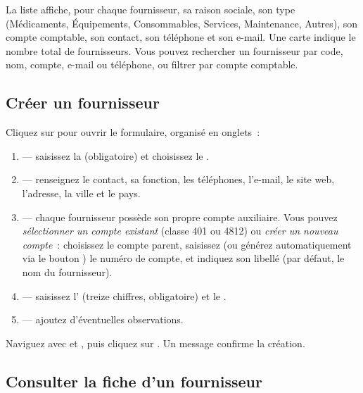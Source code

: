 La liste affiche, pour chaque fournisseur, sa raison sociale, son type (Médicaments, Équipements, Consommables, Services, Maintenance, Autres), son compte comptable, son contact, son téléphone et son e-mail. Une carte indique le nombre total de fournisseurs. Vous pouvez rechercher un fournisseur par code, nom, compte, e-mail ou téléphone, ou filtrer par compte comptable.


\subsection{Créer un fournisseur}

Cliquez sur  pour ouvrir le formulaire, organisé en onglets~:

\begin{enumerate}
  \item {} — saisissez la  (obligatoire) et choisissez le .
  \item {} — renseignez le contact, sa fonction, les téléphones, l'e-mail, le site web, l'adresse, la ville et le pays.
  \item {} — chaque fournisseur possède son propre compte auxiliaire. Vous pouvez \emph{sélectionner un compte existant} (classe 401 ou 4812) ou \emph{créer un nouveau compte}~: choisissez le compte parent, saisissez (ou générez automatiquement via le bouton ) le numéro de compte, et indiquez son libellé (par défaut, le nom du fournisseur).
  \item {} — saisissez l' (treize chiffres, obligatoire) et le .
  \item {} — ajoutez d'éventuelles observations.
\end{enumerate}

Naviguez avec  et , puis cliquez sur . Un message confirme la création.


\subsection{Consulter la fiche d'un fournisseur}


